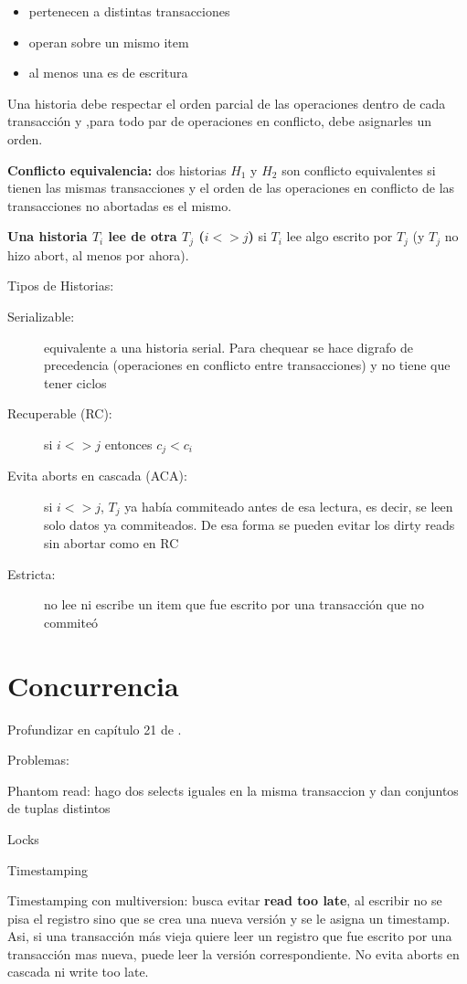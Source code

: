 \begin{itemize}
	\item pertenecen a distintas transacciones
	\item operan sobre un mismo item
	\item al menos una es de escritura
\end{itemize}

Una historia debe respectar el orden parcial de las operaciones dentro de cada transacción y ,para todo par de operaciones en conflicto, debe asignarles un orden.

\textbf{Conflicto equivalencia:} dos historias $H_1$ y $H_2$ son conflicto equivalentes si tienen las mismas transacciones y el orden de las operaciones en conflicto de las transacciones no abortadas es el mismo.

\textbf{Una historia $T_i$ lee de otra $T_j$ ($i <> j$)} si $T_i$ lee algo escrito por $T_j$ (y $T_j$ no hizo abort, al menos por ahora).

Tipos de Historias:

\begin{description}
	\item[Serializable:] equivalente a una historia serial. Para chequear se hace digrafo de precedencia (operaciones en conflicto entre transacciones) y no tiene que tener ciclos
	\item[Recuperable (RC):] si $i <> j$ entonces $c_j < c_i$
	\item[Evita aborts en cascada (ACA):] si $i <> j$, $T_j$ ya había commiteado antes de esa lectura, es decir, se leen solo datos ya commiteados. De esa forma se pueden evitar los dirty reads sin abortar como en RC
	\item[Estricta:] no lee ni escribe un item que fue escrito por una transacción que no commiteó
\end{description}

\section{Concurrencia}

Profundizar en capítulo 21 de \cite{elmasri2015}.

Problemas:

Phantom read: hago dos selects iguales en la misma transaccion y dan conjuntos de tuplas distintos

Locks

Timestamping

Timestamping con multiversion: busca evitar \textbf{read too late}, al escribir no se pisa el registro sino que se crea una nueva versión y se le asigna un timestamp. Asi, si una transacción más vieja quiere leer un registro que fue escrito por una transacción mas nueva, puede leer la versión correspondiente. No evita aborts en cascada ni write too late.

